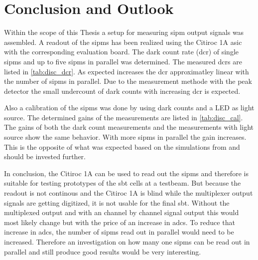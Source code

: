 \chapter{Conclusion and Outlook}
Within the scope of this Thesis a setup for measuring \ac{sipm} output signals was assembled. 
A readout of the \ac{sipm}s has been realized using the Citiroc 1A \ac{asic} with the corresponding evaluation board.
The dark count rate (\ac{dcr}) of single \acp{sipm} and up to five \acp{sipm} in parallel was determined.
The measured \acp{dcr} are listed in \autoref{tab:disc_dcr}.
As expected increases the \ac{dcr} approximatley linear with the number of \acp{sipm} in parallel. 
Due to the measurement methode with the peak detector the small undercount of dark counts with increasing \ac{dcr} is expected.

Also a calibration of the \acp{sipm} was done by using dark counts and a LED as light source.
The determined gains of the measurements are listed in \autoref{tab:disc_cal}.
The gains of both the dark count measurements and the measurements with light source show the same behavior. 
With more \acp{sipm} in parallel the gain increases. 
This is the opposite of what was expected based on the simulations from \cite{bsc_jonathan} and should be invested further.









In conclusion, the Citiroc 1A can be used to read out the \acp{sipm} and therefore is suitable for testing prototypes of the \ac{sbt} cells at a testbeam. 
But because the readout is not continous and the Citiroc 1A is blind while the multiplexer output signals are getting digitized, it is not usable for the final \ac{sbt}. 
Without the multiplexed output and with an channel by channel signal output this would most likely change but with the price of an increase in \acp{adc}.
To reduce that increase in \acp{adc}, the number of \acp{sipm} read out in parallel would need to be increased.
Therefore an investigation on how many one \acp{sipm} can be read out in parallel and still produce good results would be very interesting.
